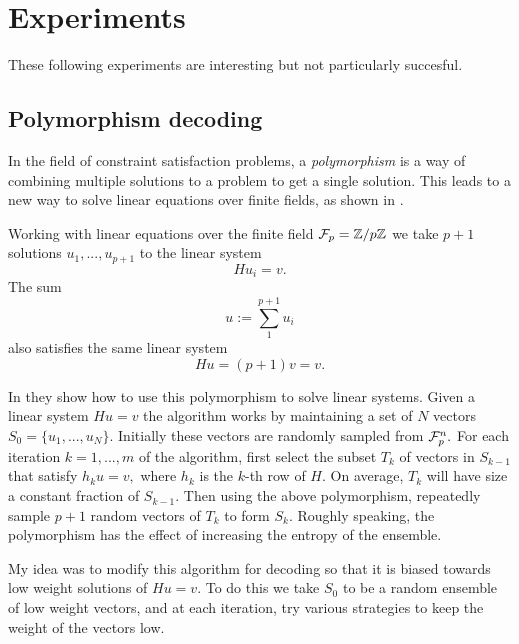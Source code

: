 \documentclass[12pt]{article}
\begin{document}
\section{Experiments}

These following experiments are interesting
but not particularly succesful.

\subsection{Polymorphism decoding}

In the field of constraint satisfaction problems,
a \emph{polymorphism} is a way of combining multiple solutions
to a problem to get a single solution.
This leads to a new way to solve linear equations
over finite fields, as shown in \cite{brown2016}.

Working with linear equations over the finite
field $\mathcal{F}_p = \mathbb{Z}/p\mathbb{Z}$
we take $p+1$ solutions $u_1,...,u_{p+1}$ 
to the linear system
$$
    H u_i = v.
$$
The sum 
$$
    u := \sum_{1}^{p+1} u_i
$$
also satisfies the same linear system
$$
    H u = (p+1)v = v.
$$

In \cite{brown2016} they show how to use this
polymorphism to solve linear systems.
Given a linear system $H u = v$
the algorithm works by maintaining a set
of $N$ vectors $S_0 = \{u_1, ..., u_N \}.$
Initially these vectors are randomly sampled from
$\mathcal{F}_p^n.$
For each iteration $k=1,...,m$ of the algorithm, first
select the subset $T_k$ of vectors in $S_{k-1}$ that satisfy 
$h_k u = v,$ where $h_k$ is the $k$-th row of $H.$
On average, $T_k$ will have size a constant fraction of $S_{k-1}$.
Then using the above polymorphism, repeatedly
sample $p+1$ random vectors of $T_k$ to
form $S_k.$
Roughly speaking,
the polymorphism has the effect of increasing the entropy
of the ensemble.

My idea was to modify this algorithm for decoding 
so that it is biased towards low weight solutions of $Hu = v.$
To do this we take $S_0$ to be a random ensemble of low
weight vectors, and at each iteration, try various
strategies to keep the weight of the vectors low.

\end{document}
